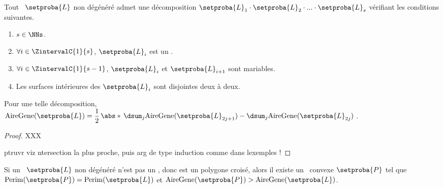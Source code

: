 \newpage

\begin{fact} \label{ngone-trick}
    Tout \ncycle\ $\setproba{L}$ non dégénéré admet une décomposition
    $\setproba{L}_1 \cdot \setproba{L}_2 \cdot ... \cdot \setproba{L}_s$ 
    vérifiant les conditions suivantes.
    \begin{enumerate}
    	\item $s \in \NNs$.

    	\item $\forall i \in \ZintervalC{1}{s}$, $\setproba{L}_i$ est un .
	
    	\item $\forall i \in \ZintervalC{1}{s-1}$, $\setproba{L}_i$ et $\setproba{L}_{i+1}$ sont mariables.

    	\item Les surfaces intérieures des $\setproba{L}_i$ sont disjointes deux à deux.
    \end{enumerate}
    
    Pour une telle décomposition, 
    $ \garea{\setproba{L}} 
    = \dfrac12 \, \abs*{\,
    	\dsum_{j} \garea{\setproba{L}_{2j + 1}}  -  \dsum_{j} \garea{\setproba{L}_{2j}}
	  \,}$.
\end{fact}


\begin{proof}
    XXX
    
    ptruvr viz ntersection la plus proche, puis arg de type induction comme dans lexemples !
\end{proof}






\begin{fact} \label{no-cross-max}
    Si un \ncycle\ $\setproba{L}$ non dégénéré n'est pas un \ngone, donc est un polygone croisé, alors il existe un \ngone\ convexe $\setproba{P}$ tel que
	$\perim{\setproba{P}} = \perim{\setproba{L}}$
	et
	$\garea{\setproba{P}} > \garea{\setproba{L}}$.
\end{fact}


